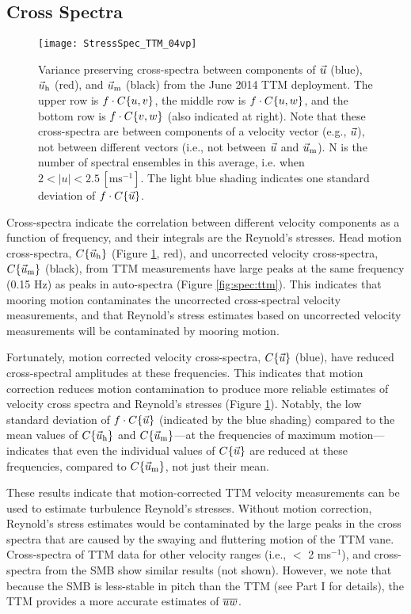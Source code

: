 \subsection{Cross Spectra}

\begin{figure}[t]
  \centering
  \texttt{[image: StressSpec\_TTM\_04vp]}
  \caption{Variance preserving cross-spectra between components of $\vec{u}$ (blue), $\vec{u}_{\mathrm{h}}$ (red), and $\vec{u}_{\mathrm{m}}$ (black) from the June 2014 TTM deployment. The upper row is $f \cdot C\{u,v\}$, the middle row is $f \cdot C\{u,w\}$, and the bottom row is $f \cdot C\{v,w\}$ (also indicated at right).  Note that these cross-spectra are between components of a velocity vector (e.g., $\vec{u}$), not between different vectors (i.e., not between $\vec{u}$ and $\vec{u}_{\mathrm{m}}$). N is the number of spectral ensembles in this average, i.e. when $2 < |u| < 2.5\,\mathrm{[ms^{-1}]}$. The light blue shading indicates one standard deviation of $f \cdot C\{\vec{u}\}$.}
  \label{fig:cspec:ttm}
\end{figure}

Cross-spectra indicate the correlation between different velocity components as a function of frequency, and their integrals are the Reynold's stresses. Head motion cross-spectra, $C\{\vec{u}_{\mathrm{h}}\}$ (Figure \ref{fig:cspec:ttm}, red), and uncorrected velocity cross-spectra, $C\lbrace \vec{u}_{\mathrm{m}} \rbrace$ (black), from TTM measurements have large peaks at the same frequency (0.15 Hz) as peaks in auto-spectra (Figure \ref{fig:spec:ttm}).  This indicates that mooring motion contaminates the uncorrected cross-spectral velocity measurements, and that Reynold's stress estimates based on uncorrected velocity measurements will be contaminated by mooring motion. 

Fortunately, motion corrected velocity cross-spectra, $C\{\vec{u}\}$ (blue), have reduced cross-spectral amplitudes at these frequencies. This indicates that motion correction reduces motion contamination to produce more reliable estimates of velocity cross spectra and Reynold's stresses (Figure \ref{fig:cspec:ttm}). Notably, the low standard deviation of $f\cdot C\{\vec{u}\}$ (indicated by the blue shading) compared to the mean values of $C\{\vec{u}_{\mathrm{h}}\}$ and $C\{\vec{u}_{\mathrm{m}}\}$---at the frequencies of maximum motion---indicates that even the individual values of $C\{\vec{u}\}$ are reduced at these frequencies, compared to $C\{\vec{u}_{\mathrm{m}}\}$, not just their mean.

These results indicate that motion-corrected TTM velocity measurements can be used to estimate turbulence Reynold's stresses. Without motion correction, Reynold's stress estimates would be contaminated by the large peaks in the cross spectra that are caused by the swaying and fluttering motion of the TTM vane. Cross-spectra of TTM data for other velocity ranges (i.e., $<$ 2 ms$^{-1}$), and cross-spectra from the SMB show similar results (not shown). However, we note that because the SMB is less-stable in pitch than the TTM (see Part I for details), the TTM provides a more accurate estimates of  $\overline{uw}$.

